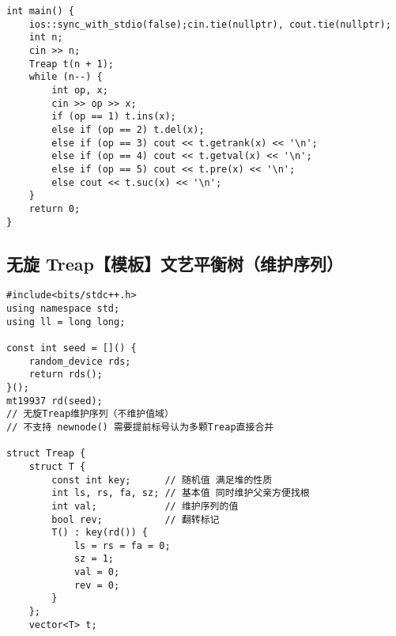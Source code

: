 \begin{verbatim}
int main() {
    ios::sync_with_stdio(false);cin.tie(nullptr), cout.tie(nullptr);
    int n;
    cin >> n;
    Treap t(n + 1);
    while (n--) {
        int op, x;
        cin >> op >> x;
        if (op == 1) t.ins(x);
        else if (op == 2) t.del(x);
        else if (op == 3) cout << t.getrank(x) << '\n';
        else if (op == 4) cout << t.getval(x) << '\n';
        else if (op == 5) cout << t.pre(x) << '\n';
        else cout << t.suc(x) << '\n';
    }
    return 0;
}
\end{verbatim}

\subsection{无旋 Treap【模板】文艺平衡树（维护序列）}
\begin{verbatim}
#include<bits/stdc++.h>
using namespace std;
using ll = long long;

const int seed = []() {
    random_device rds;
    return rds();
}();
mt19937 rd(seed);
// 无旋Treap维护序列（不维护值域）
// 不支持 newnode() 需要提前标号认为多颗Treap直接合并

struct Treap {
    struct T {
        const int key;      // 随机值 满足堆的性质
        int ls, rs, fa, sz; // 基本值 同时维护父亲方便找根
        int val;            // 维护序列的值
        bool rev;           // 翻转标记
        T() : key(rd()) {
            ls = rs = fa = 0;
            sz = 1;
            val = 0;
            rev = 0;
        }
    };
    vector<T> t;
    

\end{verbatim}
